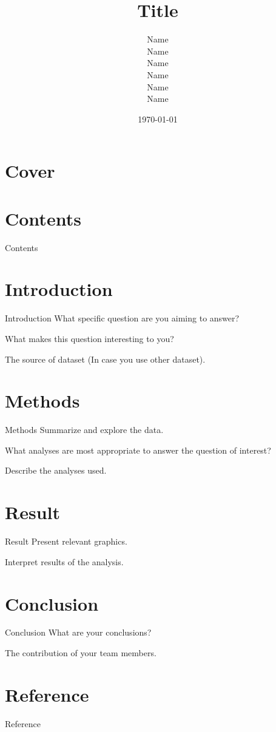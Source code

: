 \documentclass{beamer}
\title{Title}
\author{
  \parbox{0.3\textwidth}{
      \centering Name
  }
  \parbox{0.3\textwidth}{
      \centering Name
  }
  \parbox{0.3\textwidth}{
      \centering Name
  }
  \parbox{0.3\textwidth}{
      \centering Name
  }
  \parbox{0.3\textwidth}{
      \centering Name
  }
  \parbox{0.3\textwidth}{
      \centering Name
  }
}
\date{\today}
\begin{document}
\section*{Cover}
\frame{\titlepage}

\section*{Contents}
\begin{frame}{Contents}
  \tableofcontents
\end{frame}

\section{Introduction}

\begin{frame}{Introduction}
  What specific question are you aiming to answer?

  What makes this question interesting to you?

  The source of dataset (In case you use other dataset).
\end{frame}

\section{Methods}

\begin{frame}{Methods}
  Summarize and explore the data.

  What analyses are most appropriate to answer the question of interest?

  Describe the analyses used.
\end{frame}

\section{Result}

\begin{frame}{Result}
  Present relevant graphics.

  Interpret results of the analysis.
\end{frame}

\section{Conclusion}

\begin{frame}{Conclusion}
  What are your conclusions?

  The contribution of your team members.
\end{frame}

\section*{Reference}
\begin{frame}[allowframebreaks]{Reference}
  \printbibliography
\end{frame}

\appendix
\end{document}
